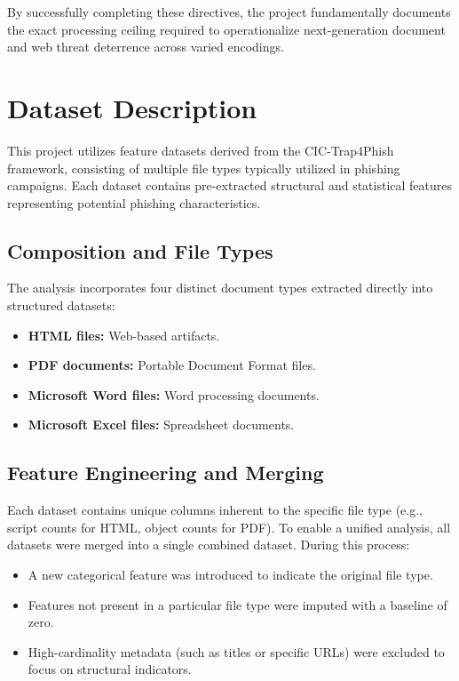 \documentclass[12pt,a4paper]{article}
\begin{document}
By successfully completing these directives, the project fundamentally documents the exact processing ceiling required to operationalize next-generation document and web threat deterrence across varied encodings.

\section{Dataset Description}
This project utilizes feature datasets derived from the CIC-Trap4Phish framework, consisting of multiple file types typically utilized in phishing campaigns. Each dataset contains pre-extracted structural and statistical features representing potential phishing characteristics.

\subsection{Composition and File Types}
The analysis incorporates four distinct document types extracted directly into structured datasets:
\begin{itemize}
    \item \textbf{HTML files:} Web-based artifacts.
    \item \textbf{PDF documents:} Portable Document Format files.
    \item \textbf{Microsoft Word files:} Word processing documents.
    \item \textbf{Microsoft Excel files:} Spreadsheet documents.
\end{itemize}

\subsection{Feature Engineering and Merging}
Each dataset contains unique columns inherent to the specific file type (e.g., script counts for HTML, object counts for PDF). To enable a unified analysis, all datasets were merged into a single combined dataset. During this process:
\begin{itemize}
    \item A new categorical feature was introduced to indicate the original file type.
    \item Features not present in a particular file type were imputed with a baseline of zero.
    \item High-cardinality metadata (such as titles or specific URLs) were excluded to focus on structural indicators.
\end{itemize}
\end{document}
